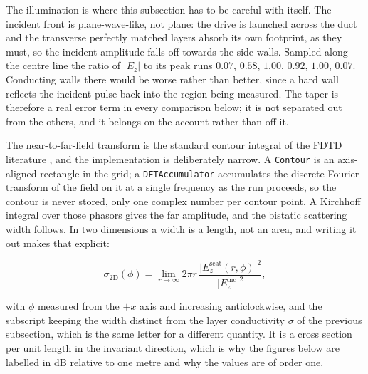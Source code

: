 The illumination is where this subsection has to be careful with itself. The incident front is plane-wave-like,
not plane: the drive is launched across the duct and the transverse perfectly matched layers absorb its own
footprint, as they must, so the incident amplitude falls off towards the side walls. Sampled along the centre
line the ratio of $|E_z|$ to its peak runs $0.07$, $0.58$, $1.00$, $0.92$, $1.00$, $0.07$. Conducting walls
there would be worse rather than better, since a hard wall reflects the incident pulse back into the region
being measured. The taper is therefore a real error term in every comparison below; it is not separated out
from the others, and it belongs on the account rather than off it.

The near-to-far-field transform is the standard contour integral of the FDTD literature \cite{taflove2005},
and the implementation is deliberately narrow. A \texttt{Contour} is an axis-aligned rectangle in the grid; a
\texttt{DFTAccumulator} accumulates the discrete Fourier transform of the field on it at a single frequency as
the run proceeds, so the contour is never stored, only one complex number per contour point. A Kirchhoff
integral over those phasors gives the far amplitude, and the bistatic scattering width follows. In two
dimensions a width is a length, not an area, and writing it out makes that explicit:

\begin{equation}
  \sigma_{2\mathrm{D}}(\phi) = \lim_{r\to\infty} 2\pi r\,
  \frac{\lvert E_z^{\mathrm{scat}}(r,\phi)\rvert^{2}}{\lvert E_z^{\mathrm{inc}}\rvert^{2}},
  \label{eq:sigma2d}
\end{equation}

with $\phi$ measured from the $+x$ axis and increasing anticlockwise, and the subscript keeping the width
distinct from the layer conductivity $\sigma$ of the previous subsection, which is the same letter for a
different quantity. It is a cross section per unit length in the invariant direction, which is why the
figures below are labelled in dB relative to one metre and why the values are of order one.

